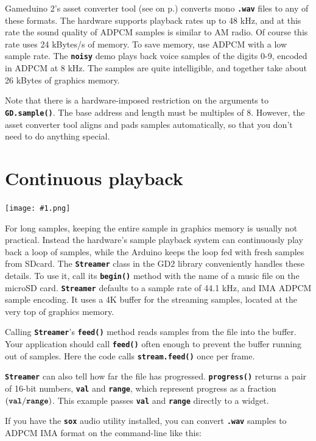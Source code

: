 \documentclass[10pt]{book}
\makeatletter
\newcommand{\gdtwos}{Gameduino 2's }
\newcommand{\png}[1]{
\begin{center}
\texttt{[image: \#1.png]}
\end{center}
}
\newcommand{\mach}[1]{\texttt{\textbf{#1}}}
\newcommand{\cmdidx}[1]{
\index{#1@\mach{#1()}}
}
\newcommand{\cmd}[1]{\cmdidx{cmd\_#1}\nameref{cmd:#1}}
\newcommand{\xref}[1]{\textit{\nameref{#1}} on  p.\pageref{#1}}
\makeatother
\begin{document}
\gdtwos asset converter tool (see \xref{assets}) converts mono \mach{.wav}
files to any of these formats.
The hardware supports playback rates up to 48 kHz, and at this rate
the sound quality of ADPCM samples is similar to AM radio.
Of course this rate uses 24 kBytes/s of memory.
To save memory, use ADPCM with a low sample rate. The \mach{noisy} demo
plays back voice samples of the digits 0-9, encoded in ADPCM at 8 kHz.
The samples are quite intelligible, and together take about 26 kBytes of
graphics memory.

Note that there is a hardware-imposed restriction on the arguments to \mach{GD.sample()}.
The base address and length must be multiples of 8.
However, the asset converter tool aligns and pads samples automatically,
so that you don't need to do anything special.

\newpage
{}

\newpage
\section{Continuous playback}

\png{song}

For long samples, keeping the entire sample in graphics memory is usually not practical.
Instead the hardware's sample playback system can continuously play back a loop of samples, while the Arduino keeps the loop fed with
fresh samples from SDcard.
The \mach{Streamer} class in the GD2 library conveniently handles these details.
To use it, call its \mach{begin()} method with the name of a music file on the microSD card.
\mach{Streamer} defaults to a sample rate of 44.1 kHz, and IMA ADPCM sample encoding.
It uses a 4K buffer for the streaming samples, located at the very top of graphics memory.

Calling \mach{Streamer}'s \mach{feed()} method reads samples from the file into the buffer.
Your application should call \mach{feed()} often enough to prevent the buffer running out of samples.
Here the code calls \mach{stream.feed()} once per frame.

\mach{Streamer} can also tell how far the file has progressed.
\mach{progress()} returns a pair of 16-bit numbers,
\mach{val} and \mach{range}, which represent progress as a fraction $(\mach{val} / \mach{range})$.
This example passes \mach{val} and \mach{range} directly to a \cmd{slider} widget.

If you have the \mach{sox} audio utility installed, you can convert \mach{.wav} samples to ADPCM IMA format on the command-line like this:
\end{document}
